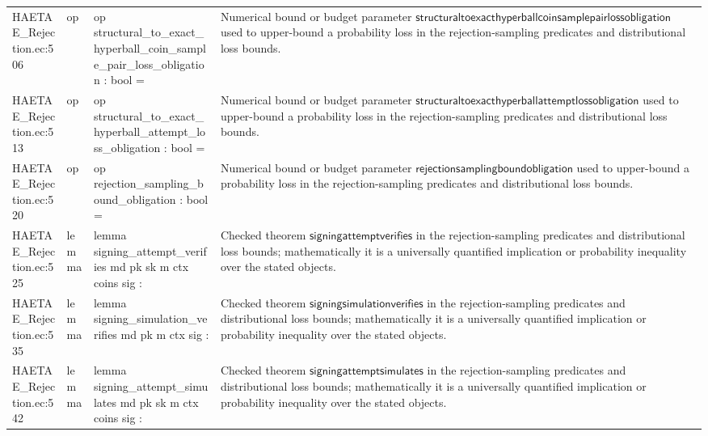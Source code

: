 \documentclass[10pt]{article}
\begin{document}
\begin{longtable}{L{0.11\textwidth}L{0.055\textwidth}L{0.385\textwidth}L{0.41\textwidth}}
HAETAE\_\allowbreak{}Rejection.\allowbreak{}ec:\allowbreak{}506 & op & {\ttfamily\scriptsize op structural\_\allowbreak{}to\_\allowbreak{}exact\_\allowbreak{}hyperball\_\allowbreak{}coin\_\allowbreak{}sample\_\allowbreak{}pair\_\allowbreak{}loss\_\allowbreak{}obligation : bool =} & Numerical bound or budget parameter $\mathsf{structuraltoexacthyperballcoinsamplepairlossobligation}$ used to upper-bound a probability loss in the rejection-sampling predicates and distributional loss bounds. \\
HAETAE\_\allowbreak{}Rejection.\allowbreak{}ec:\allowbreak{}513 & op & {\ttfamily\scriptsize op structural\_\allowbreak{}to\_\allowbreak{}exact\_\allowbreak{}hyperball\_\allowbreak{}attempt\_\allowbreak{}loss\_\allowbreak{}obligation : bool =} & Numerical bound or budget parameter $\mathsf{structuraltoexacthyperballattemptlossobligation}$ used to upper-bound a probability loss in the rejection-sampling predicates and distributional loss bounds. \\
HAETAE\_\allowbreak{}Rejection.\allowbreak{}ec:\allowbreak{}520 & op & {\ttfamily\scriptsize op rejection\_\allowbreak{}sampling\_\allowbreak{}bound\_\allowbreak{}obligation : bool =} & Numerical bound or budget parameter $\mathsf{rejectionsamplingboundobligation}$ used to upper-bound a probability loss in the rejection-sampling predicates and distributional loss bounds. \\
HAETAE\_\allowbreak{}Rejection.\allowbreak{}ec:\allowbreak{}525 & lemma & {\ttfamily\scriptsize lemma signing\_\allowbreak{}attempt\_\allowbreak{}verifies md pk sk m ctx coins sig :} & Checked theorem $\mathsf{signingattemptverifies}$ in the rejection-sampling predicates and distributional loss bounds; mathematically it is a universally quantified implication or probability inequality over the stated objects. \\
HAETAE\_\allowbreak{}Rejection.\allowbreak{}ec:\allowbreak{}535 & lemma & {\ttfamily\scriptsize lemma signing\_\allowbreak{}simulation\_\allowbreak{}verifies md pk m ctx sig :} & Checked theorem $\mathsf{signingsimulationverifies}$ in the rejection-sampling predicates and distributional loss bounds; mathematically it is a universally quantified implication or probability inequality over the stated objects. \\
HAETAE\_\allowbreak{}Rejection.\allowbreak{}ec:\allowbreak{}542 & lemma & {\ttfamily\scriptsize lemma signing\_\allowbreak{}attempt\_\allowbreak{}simulates md pk sk m ctx coins sig :} & Checked theorem $\mathsf{signingattemptsimulates}$ in the rejection-sampling predicates and distributional loss bounds; mathematically it is a universally quantified implication or probability inequality over the stated objects. \\

\end{longtable}
\end{document}
